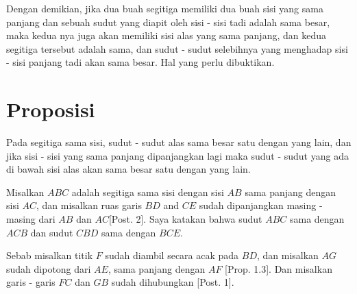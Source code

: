 \documentclass[a4paper]{book}
\begin{document}
Dengan demikian, jika dua buah segitiga memiliki dua buah sisi yang sama
panjang dan sebuah sudut yang diapit oleh sisi - sisi tadi adalah sama besar,
maka kedua nya juga akan memiliki sisi alas yang sama panjang, dan kedua
segitiga tersebut adalah sama, dan sudut - sudut selebihnya yang menghadap
sisi - sisi panjang tadi akan sama besar. Hal yang perlu dibuktikan.

\section*{\centering Proposisi \thesection} 

Pada segitiga sama sisi, sudut - sudut alas sama besar satu dengan yang lain, 
dan jika sisi - sisi yang sama panjang dipanjangkan lagi maka sudut - sudut 
yang ada di bawah sisi alas akan sama besar satu dengan yang lain.

\begin{center}
\end{center}

Misalkan $ABC$ adalah segitiga sama sisi dengan sisi $AB$ sama panjang dengan 
sisi $AC$, dan misalkan ruas garis $BD$ and $CE$ sudah dipanjangkan 
masing - masing dari $AB$ dan $AC$[Post. 2].  Saya katakan bahwa sudut $ABC$ 
sama dengan $ACB$ dan sudut $CBD$ sama dengan $BCE$.

Sebab misalkan titik $F$ sudah diambil secara acak pada $BD$, dan misalkan 
$AG$ sudah dipotong dari  $AE$, sama panjang dengan $AF$ [Prop. 1.3]. Dan 
misalkan garis - garis $FC$ dan $GB$ sudah dihubungkan [Post. 1].
\end{document}
